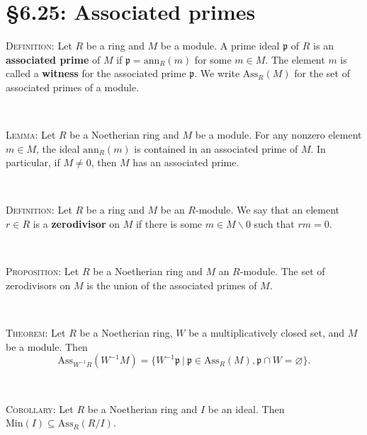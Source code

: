 \documentclass[12pt]{amsart}
\newcommand{\p}{\mathfrak{p}}
\newcommand{\ann}{\mathrm{ann}}
\newcommand{\Min}{\mathrm{Min}}
\newcommand{\Ass}{\mathrm{Ass}}
\renewcommand{\1}{\mathbbm{1}}
\newcommand{\showsol}[1]{\def\displaysol{#1}}
\begin{document}
\showsol{0}
	
	\thispagestyle{empty}
	
	\section*{\S6.25: Associated primes}
	
	\begin{framed}

\noindent \textsc{Definition:} Let $R$ be a ring and $M$ be a module. A prime ideal $\p$ of $R$ is an \textbf{associated prime} of $M$ if $\p = \ann_R(m)$ for some $m\in M$. The element $m$ is called a \textbf{witness} for the associated prime $\p$. We write $\Ass_R(M)$ for the set of associated primes of a module.

\

\noindent \textsc{Lemma:} Let $R$ be a Noetherian ring and $M$ be a module. 
For any nonzero element $m\in M$, the ideal $\ann_R(m)$ is contained in an associated prime of $M$. In particular, if $M\neq 0$, then $M$ has an associated prime.

\

\noindent \textsc{Definition:} Let $R$ be a ring and $M$ be an $R$-module. We say that an element $r\in R$ is a \textbf{zerodivisor} on $M$ if there is some $m \in M\smallsetminus 0$ such that $rm = 0$.

\

\noindent \textsc{Proposition:} Let $R$ be a Noetherian ring and $M$ an $R$-module. The set of zerodivisors on $M$ is the union of the associated primes of $M$.

\

\noindent \textsc{Theorem:} Let $R$ be a Noetherian ring, $W$ be a multiplicatively closed set, and $M$ be a module. Then
\[ \Ass_{W^{-1}R}(W^{-1}M) = \{ W^{-1}\p \ | \ \p\in \Ass_R(M), \p\cap W=\varnothing\}.\]

\

\noindent \textsc{Corollary:} Let $R$ be a Noetherian ring and  $I$ be an ideal. Then $\Min(I) \subseteq \Ass_R(R/I)$.
\end{framed}


	
\end{document}

